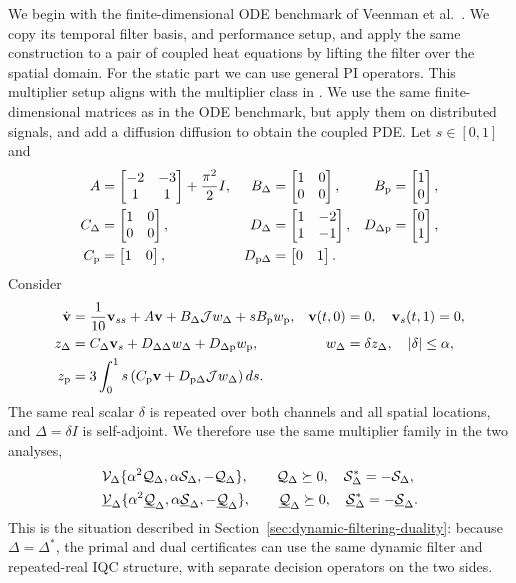 We begin with the finite-dimensional ODE benchmark of
Veenman et al.~\cite[Sec.~8.1]{veenman2016robust}. We copy its temporal filter basis, 
and performance setup, and apply the same
construction to a pair of coupled heat equations by lifting the filter over the 
spatial domain. For the static part we can use general PI operators. This multiplier
setup aligns with the multiplier class in \cite[Lem.~10]{10156335}. We use
the same finite-dimensional matrices as in the ODE benchmark, but apply them on
distributed signals, and add a diffusion
diffusion to obtain the coupled PDE. Let $s\in[0,1]$ and
\begin{align*}
 A&=\begin{bmatrix}-2&-3\\1&1\end{bmatrix}+\frac{\pi^2}{2}I,
 &B_\Delta&=\begin{bmatrix}1&0\\0&0\end{bmatrix},&B_{{\mathrm{p}}}&=\begin{bmatrix}1\\0\end{bmatrix},\\
 C_\Delta&=\begin{bmatrix}1&0\\0&0\end{bmatrix},
 &D_{\Delta}&=\begin{bmatrix}1&-2\\1&-1\end{bmatrix},
 &D_{\Delta{\mathrm{p}}}&=\begin{bmatrix}0\\1\end{bmatrix},\\
 C_{{\mathrm{p}}}&=\begin{bmatrix}1&0\end{bmatrix},
 &D_{{\mathrm{p}}\Delta}&=\begin{bmatrix}0&1\end{bmatrix}.
\end{align*}
Consider
\begin{align*}
 \dot{\mathbf{v}}&=\frac{1}{10}\mathbf{v}_{ss}+A\mathbf{v}
      +B_\Delta\mathcal{J}w_\Delta+sB_{{\mathrm{p}}}w_{{\mathrm{p}}},
 &\mathbf{v}(t,0)&=0,\quad \mathbf{v}_s(t,1)=0,\\
 z_\Delta&=C_\Delta\mathbf{v}_s+D_{\Delta\Delta}w_\Delta
      +D_{\Delta{\mathrm{p}}}w_{{\mathrm{p}}},
 &w_\Delta&=\delta z_\Delta,\quad |\delta|\leq\alpha,\\
 z_{{\mathrm{p}}}&=3\int_0^1s\left(C_{{\mathrm{p}}}\mathbf{v}
      +D_{{\mathrm{p}}\Delta}\mathcal{J}w_\Delta\right)ds.&&
\end{align*}
The same real scalar $\delta$ is repeated over both channels and all spatial
locations, and $\Delta=\delta I$ is self-adjoint. We therefore use the same
multiplier family in the two analyses,
\begin{align*}
 &\mathcal{V}_\Delta\{\alpha^2\mathcal{Q}_\Delta,
 \alpha\mathcal{S}_\Delta,-\mathcal{Q}_\Delta\},\qquad
 \mathcal{Q}_\Delta\succeq0,\quad \mathcal{S}_\Delta^*=-\mathcal{S}_\Delta, \\
&\underline{\mathcal{V}}_\Delta\{\alpha^2\underline{\mathcal{Q}}_\Delta,
 \alpha\underline{\mathcal{S}}_\Delta,-\underline{\mathcal{Q}}_\Delta\},\qquad
 \underline{\mathcal{Q}}_\Delta\succeq0,\quad \underline{\mathcal{S}}_\Delta^*=-\underline{\mathcal{S}}_\Delta.
\end{align*}
This is the situation
described in Section~\ref{sec:dynamic-filtering-duality}: because
$\Delta=\Delta^*$, the primal and dual certificates can use the same dynamic
filter and repeated-real IQC structure, with separate decision operators on
the two sides.

